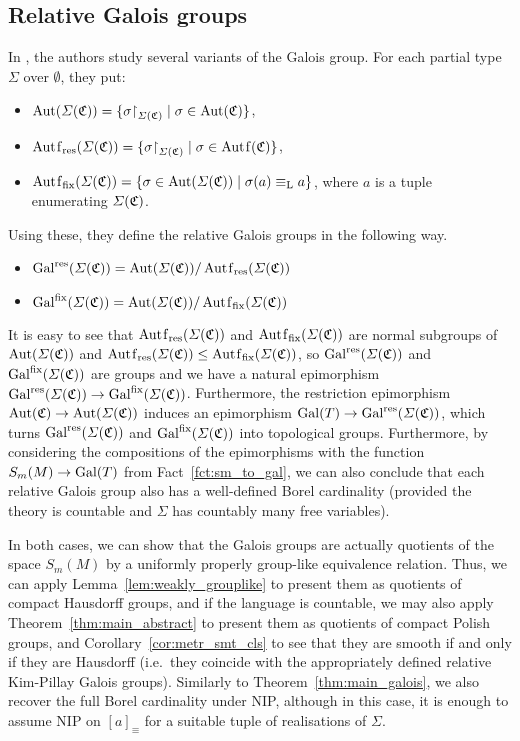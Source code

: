 	\subsection*{Relative Galois groups}
	\newcommand{\res}{{\mathrm{res}}}
	\newcommand{\fix}{{\mathrm{fix}}}
	In \cite{DKL17}, the authors study several variants of the Galois group. For each partial type $\Sigma$ over $\emptyset$, they put:
	\begin{itemize}
		\item
		$\operatorname{{Aut}}(\Sigma({\mathfrak C}))=\{\sigma\mathord{\upharpoonright}_{\Sigma({\mathfrak C})}\mid \sigma\in \operatorname{{Aut}}({\mathfrak C}) \}$,
		\item
		$\Autf_\res(\Sigma(\fC))=\{\sigma\restr_{\Sigma(\fC)}\mid \sigma\in \Autf(\fC) \}$,
		\item
		$\Autf_\fix(\Sigma(\fC))=\{\sigma\in \Aut(\Sigma(\fC))\mid \sigma(a)\equiv_\Lasc a\}$, where $a$ is a tuple enumerating $\Sigma({\mathfrak C})$.
	\end{itemize}
	Using these, they define the relative Galois groups in the following way.
	\begin{itemize}
		\item
		$\Gal^\res(\Sigma(\fC))=\Aut(\Sigma(\fC))/\Autf_\res(\Sigma(\fC))$
		\item
		$\Gal^\fix(\Sigma(\fC))=\Aut(\Sigma(\fC))/\Autf_\fix(\Sigma(\fC))$
	\end{itemize}
	It is easy to see that $\Autf_\res(\Sigma(\fC))$ and $\Autf_\fix(\Sigma(\fC))$ are normal subgroups of $\operatorname{{Aut}}(\Sigma({\mathfrak C}))$ and $\Autf_\res(\Sigma(\fC))\leq \Autf_\fix(\Sigma(\fC))$, so $\Gal^\res(\Sigma(\fC))$ and $\Gal^\fix(\Sigma(\fC))$ are groups and we have a natural epimorphism $\Gal^\res(\Sigma(\fC))\to \Gal^\fix(\Sigma(\fC))$. Furthermore, the restriction epimorphism $\operatorname{{Aut}}({\mathfrak C})\to \operatorname{{Aut}}(\Sigma({\mathfrak C}))$ induces an epimorphism $\Gal(T)\to \Gal^\res(\Sigma(\fC))$, which turns $\Gal^\res(\Sigma(\fC))$ and $\Gal^\fix(\Sigma(\fC))$ into topological groups. Furthermore, by considering the compositions of the epimorphisms with the function $S_m(M)\to \operatorname{{Gal}}(T)$ from Fact~\ref{fct:sm_to_gal}, we can also conclude that each relative Galois group also has a well-defined Borel cardinality (provided the theory is countable and $\Sigma$ has countably many free variables).
	
	In both cases, we can show that the Galois groups are actually quotients of the space $S_m(M)$ by a uniformly properly group-like equivalence relation. Thus, we can apply Lemma~\ref{lem:weakly_grouplike} to present them as quotients of compact Hausdorff groups, and if the language is countable, we may also apply Theorem~\ref{thm:main_abstract} to present them as quotients of compact Polish groups, and Corollary~\ref{cor:metr_smt_cls} to see that they are smooth if and only if they are Hausdorff  (i.e.\ they coincide with the appropriately defined relative Kim-Pillay Galois groups). Similarly to Theorem~\ref{thm:main_galois}, we also recover the full Borel cardinality under NIP, although in this case, it is enough to assume NIP on $[a]_{\equiv}$ for a suitable tuple of realisations of $\Sigma$.
	
